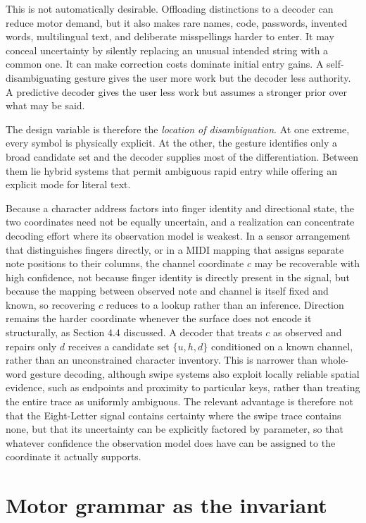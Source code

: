 \documentclass[11pt]{article}
\begin{document}
This is not automatically desirable. Offloading distinctions to a decoder can reduce motor demand, but it also makes rare names, code, passwords, invented words, multilingual text, and deliberate misspellings harder to enter. It may conceal uncertainty by silently replacing an unusual intended string with a common one. It can make correction costs dominate initial entry gains. A self-disambiguating gesture gives the user more work but the decoder less authority. A predictive decoder gives the user less work but assumes a stronger prior over what may be said.

The design variable is therefore the \emph{location of disambiguation}. At one extreme, every symbol is physically explicit. At the other, the gesture identifies only a broad candidate set and the decoder supplies most of the differentiation. Between them lie hybrid systems that permit ambiguous rapid entry while offering an explicit mode for literal text.

Because a character address factors into finger identity and directional state, the two coordinates need not be equally uncertain, and a realization can concentrate decoding effort where its observation model is weakest. In a sensor arrangement that distinguishes fingers directly, or in a MIDI mapping that assigns separate note positions to their columns, the channel coordinate $c$ may be recoverable with high confidence, not because finger identity is directly present in the signal, but because the mapping between observed note and channel is itself fixed and known, so recovering $c$ reduces to a lookup rather than an inference. Direction remains the harder coordinate whenever the surface does not encode it structurally, as Section 4.4 discussed. A decoder that treats $c$ as observed and repairs only $d$ receives a candidate set $\{u,h,d\}$ conditioned on a known channel, rather than an unconstrained character inventory. This is narrower than whole-word gesture decoding, although swipe systems also exploit locally reliable spatial evidence, such as endpoints and proximity to particular keys, rather than treating the entire trace as uniformly ambiguous. The relevant advantage is therefore not that the Eight-Letter signal contains certainty where the swipe trace contains none, but that its uncertainty can be explicitly factored by parameter, so that whatever confidence the observation model does have can be assigned to the coordinate it actually supports.

\section{Motor grammar as the invariant}
\end{document}
